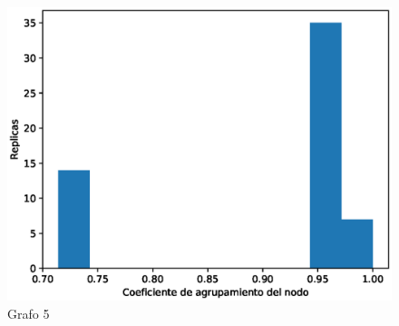 \documentclass{article}
\begin{document}
\begin{figure}[H]
    \includegraphics[scale=0.6]{hist-grado-5}
    \caption{Grafo 5}
    \label{fig:matriz}
\end{figure}
\end{document}
